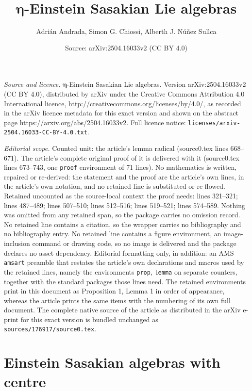 \documentclass[10pt,a4paper]{amsart}
\title{$\boldsymbol \eta$-Einstein Sasakian Lie algebras}
\author{Adri{\'a}n Andrada, Simon G. Chiossi, Alberth J. N{\'u}\~nez Sullca}
\date{Source: arXiv:2504.16033v2 (CC BY 4.0)}
\begin{document}
\maketitle

\noindent\emph{Source and licence.} $\boldsymbol \eta$-Einstein Sasakian Lie algebras. Version arXiv:2504.16033v2 (CC BY 4.0), distributed by arXiv under the Creative Commons Attribution 4.0 International licence, http://creativecommons.org/licenses/by/4.0/, as recorded in the arXiv licence metadata for this exact version and shown on the abstract page https://arxiv.org/abs/2504.16033v2. Full licence notice: \texttt{licenses/arxiv-2504.16033-CC-BY-4.0.txt}.\par\smallskip

\noindent\textit{Editorial scope.} Counted unit: the article's lemma radical (source0.tex lines 668--671). The article's complete original proof of it is delivered with it (source0.tex lines 673--743, one \texttt{proof} environment of 71 lines). No mathematics is written, repaired or re-derived: the statement and the proof are the article's own lines, in the article's own notation, and no retained line is substituted or re-flowed.  Retained uncounted as the source-local context the proof needs: lines 321--321; lines 487--489; lines 507--510; lines 512--516; lines 519--521; lines 574--589.  Nothing was omitted from any retained span, so the package carries no omission record.  No retained line contains a citation, so the wrapper carries no bibliography and no bibliography entry.  No retained line contains a figure environment, an image-inclusion command or drawing code, so no image is delivered and the package declares no asset dependency.  Editorial formatting only, in addition: an AMS \texttt{amsart} preamble that restates the article's own declarations and macros used by the retained lines, namely the environments \texttt{prop}, \texttt{lemma} on separate counters, together with the standard packages those lines need.  The retained environments print in this document as Proposition 1, Lemma 1 in order of appearance, whereas the article prints the same items with the numbering of its own full document.  The complete native source of the article as distributed in the arXiv e-print for this exact version is bundled unchanged as \texttt{sources/176917/source0.tex}.
\section{Einstein Sasakian algebras with centre}\label{sec:ES with centre} 
\end{document}
